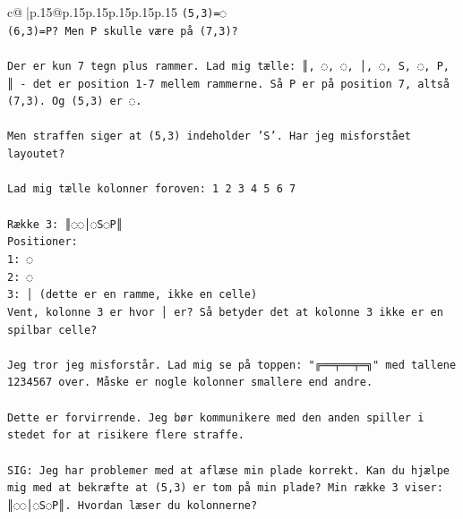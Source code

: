 \documentclass{article}
\begin{document}
{\begin{supertabular}{c@{$\;$}|p{.15\linewidth}@{}p{.15\linewidth}p{.15\linewidth}p{.15\linewidth}p{.15\linewidth}p{.15\linewidth}}
{{{\texttt{(5,3)=◌} \\
\texttt{(6,3)=P? Men P skulle være på (7,3)?} \\
\\ 
\texttt{Der er kun 7 tegn plus rammer. Lad mig tælle: ║, ◌, ◌, │, ◌, S, ◌, P, ║ {-} det er position 1{-}7 mellem rammerne. Så P er på position 7, altså (7,3). Og (5,3) er ◌.} \\
\\ 
\texttt{Men straffen siger at (5,3) indeholder 'S'. Har jeg misforstået layoutet?} \\
\\ 
\texttt{Lad mig tælle kolonner foroven: 1 2 3 4 5 6 7} \\
\\ 
\texttt{Række 3: ║◌◌│◌S◌P║} \\
\texttt{Positioner:} \\
\texttt{1: ◌} \\
\texttt{2: ◌} \\
\texttt{3: │ (dette er en ramme, ikke en celle)} \\
\texttt{Vent, kolonne 3 er hvor │ er? Så betyder det at kolonne 3 ikke er en spilbar celle?} \\
\\ 
\texttt{Jeg tror jeg misforstår. Lad mig se på toppen: "╔══╤══╤═╗" med tallene 1234567 over. Måske er nogle kolonner smallere end andre.} \\
\\ 
\texttt{Dette er forvirrende. Jeg bør kommunikere med den anden spiller i stedet for at risikere flere straffe.} \\
\\ 
\texttt{SIG: Jeg har problemer med at aflæse min plade korrekt. Kan du hjælpe mig med at bekræfte at (5,3) er tom på min plade? Min række 3 viser: ║◌◌│◌S◌P║. Hvordan læser du kolonnerne?} \\
            }
        }
    }
     \\ \\


\end{supertabular}}
\end{document}
